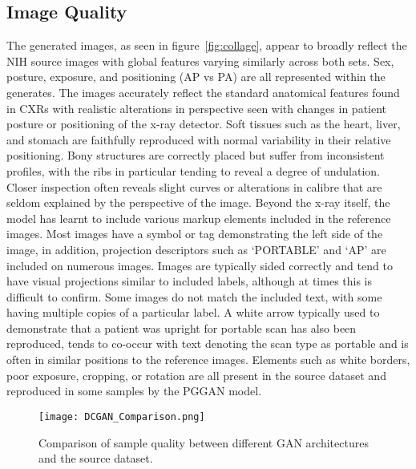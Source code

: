 \documentclass{article}
\begin{document}
\subsection{Image Quality}
\label{sec:img_quality}
The generated images, as seen in figure~\ref{fig:collage}, appear to broadly reflect the NIH source images with global features varying similarly across both sets. Sex, posture, exposure, and positioning (AP vs PA) are all represented within the generates. The images accurately reflect the standard anatomical features found in CXRs with realistic alterations in perspective seen with changes in patient posture or positioning of the x-ray detector. Soft tissues such as the heart, liver, and stomach are faithfully reproduced with normal variability in their relative positioning. Bony structures are correctly placed but suffer from inconsistent profiles, with the ribs in particular tending to reveal a degree of undulation. Closer inspection often reveals slight curves or alterations in calibre that are seldom explained by the perspective of the image. Beyond the x-ray itself, the model has learnt to include various markup elements included in the reference images. Most images have a symbol or tag demonstrating the left side of the image, in addition, projection descriptors such as `PORTABLE' and `AP' are included on numerous images. Images are typically sided correctly and tend to have visual projections similar to included labels, although at times this is difficult to confirm. Some images do not match the included text, with some having multiple copies of a particular label. A white arrow typically used to demonstrate that a patient was upright for portable scan has also been reproduced, tends to co-occur with text denoting the scan type as portable and is often in similar positions to the reference images. Elements such as white borders, poor exposure, cropping, or rotation are all present in the source dataset and reproduced in some samples by the PGGAN model.

\begin{figure}
    \centering
    \texttt{[image: DCGAN\_Comparison.png]}
    \caption{Comparison of sample quality between different GAN architectures and the source dataset.}
    \label{fig:DCGAN}
\end{figure}
\end{document}

